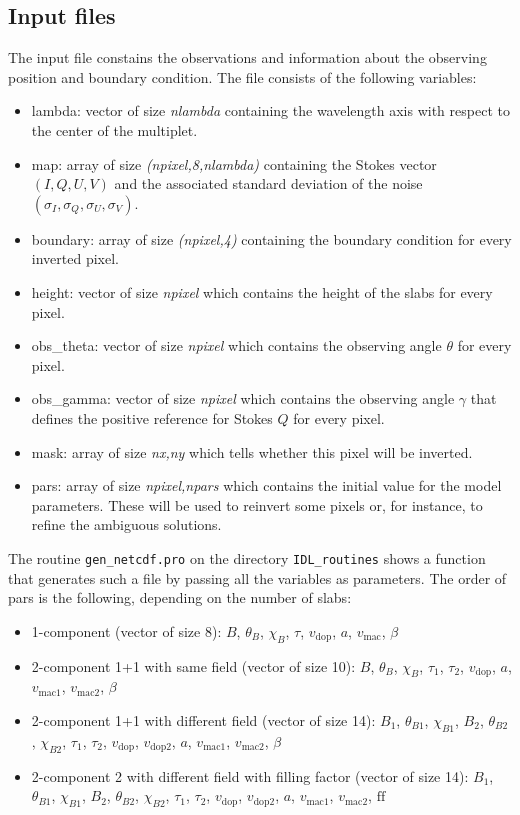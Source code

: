\documentclass[12pt]{article}
\begin{document}
\subsection{Input files}
The input file constains the
observations and information about the observing position and boundary condition. The file
consists of the following variables:
\begin{itemize}
\item lambda: vector of size \textit{nlambda} containing the wavelength axis with respect to the center of the multiplet.
\item map: array of size \textit{(npixel,8,nlambda)} containing the Stokes vector $(I,Q,U,V)$ and
the associated standard deviation of the noise $(\sigma_I,\sigma_Q,\sigma_U,\sigma_V)$.
\item boundary: array of size \textit{(npixel,4)} containing the boundary condition for every inverted pixel.
\item height: vector of size \textit{npixel} which contains the height of the slabs for every pixel.
\item obs\_theta: vector of size \textit{npixel} which contains the observing angle $\theta$ for every pixel.
\item obs\_gamma: vector of size \textit{npixel} which contains the observing angle $\gamma$ that defines the positive
reference for Stokes $Q$ for every pixel.
\item mask: array of size \textit{nx,ny} which tells whether this pixel will be inverted.
\item pars: array of size \textit{npixel,npars} which contains the initial value for the model parameters. These will be
used to reinvert some pixels or, for instance, to refine the ambiguous solutions.
\end{itemize}
The routine \texttt{gen\_netcdf.pro} on the directory \texttt{IDL\_routines} shows a function that
generates such a file by passing all the variables as parameters.
The order of pars is the following, depending on the number of slabs:
\begin{itemize}
\item 1-component (vector of size 8): $B$, $\theta_B$, $\chi_B$, $\tau$, $v_\mathrm{dop}$, $a$, $v_\mathrm{mac}$, $\beta$
\item 2-component 1+1 with same field (vector of size 10): $B$, $\theta_B$, $\chi_B$, $\tau_1$, $\tau_2$, $v_\mathrm{dop}$, $a$, $v_\mathrm{mac1}$, $v_\mathrm{mac2}$, $\beta$
\item 2-component 1+1 with different field (vector of size 14): $B_1$, $\theta_{B1}$, $\chi_{B1}$, $B_2$, $\theta_{B2}$, $\chi_{B2}$, $\tau_1$, $\tau_2$, $v_\mathrm{dop}$, $v_\mathrm{dop2}$, $a$, $v_\mathrm{mac1}$, $v_\mathrm{mac2}$, $\beta$
\item 2-component 2 with different field with filling factor (vector of size 14): $B_1$, $\theta_{B1}$, $\chi_{B1}$, $B_2$, $\theta_{B2}$, $\chi_{B2}$, $\tau_1$, $\tau_2$, $v_\mathrm{dop}$, $v_\mathrm{dop2}$, $a$, 
$v_\mathrm{mac1}$, $v_\mathrm{mac2}$, $\mathrm{ff}$
\end{itemize}
\end{document}
